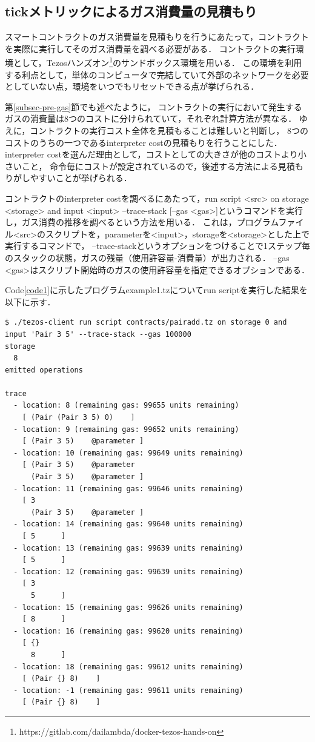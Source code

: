 \documentclass{kuisthesis}
\begin{document}
\subsection{tickメトリックによるガス消費量の見積もり} \label{subsec-pro-gas}
スマートコントラクトのガス消費量を見積もりを行うにあたって，コントラクトを実際に実行してそのガス消費量を調べる必要がある．
コントラクトの実行環境として，Tezosハンズオン\footnote{https://gitlab.com/dailambda/docker-tezos-hands-on}のサンドボックス環境を用いる．
この環境を利用する利点として，単体のコンピュータで完結していて外部のネットワークを必要としていない点，環境をいつでもリセットできる点が挙げられる．

第\ref{subsec-pre-gas}節でも述べたように，
コントラクトの実行において発生するガスの消費量は8つのコストに分けられていて，それぞれ計算方法が異なる．
ゆえに，コントラクトの実行コスト全体を見積もることは難しいと判断し，
8つのコストのうちの一つであるinterpreter costの見積もりを行うことにした．
interpreter costを選んだ理由として，コストとしての大きさが他のコストより小さいこと，
命令毎にコストが設定されているので，後述する方法による見積もりがしやすいことが挙げられる．

コントラクトのinterpreter costを調べるにあたって，run script <src> on storage <storage> and input <input> --trace-stack [--gas <gas>]というコマンドを実行し，ガス消費の推移を調べるという方法を用いる．
これは，プログラムファイル<src>のスクリプトを，parameterを<input>，storageを<storage>とした上で実行するコマンドで，
--trace-stackというオプションをつけることで1ステップ毎のスタックの状態，ガスの残量（使用許容量-消費量）が出力される．
--gas <gas>はスクリプト開始時のガスの使用許容量を指定できるオプションである．

Code\ref{code1}に示したプログラムexample1.tzについてrun scriptを実行した結果を以下に示す．

\begin{lstlisting}[basicstyle={\ttfamily\color{base}\scriptsize}]
$ ./tezos-client run script contracts/pairadd.tz on storage 0 and input 'Pair 3 5' --trace-stack --gas 100000
storage
  8
emitted operations
  
trace
  - location: 8 (remaining gas: 99655 units remaining)
    [ (Pair (Pair 3 5) 0)  	 ]
  - location: 9 (remaining gas: 99652 units remaining)
    [ (Pair 3 5)  	@parameter ]
  - location: 10 (remaining gas: 99649 units remaining)
    [ (Pair 3 5)  	@parameter
      (Pair 3 5)  	@parameter ]
  - location: 11 (remaining gas: 99646 units remaining)
    [ 3  	
      (Pair 3 5)  	@parameter ]
  - location: 14 (remaining gas: 99640 units remaining)
    [ 5  	 ]
  - location: 13 (remaining gas: 99639 units remaining)
    [ 5  	 ]
  - location: 12 (remaining gas: 99639 units remaining)
    [ 3  	
      5  	 ]
  - location: 15 (remaining gas: 99626 units remaining)
    [ 8  	 ]
  - location: 16 (remaining gas: 99620 units remaining)
    [ {}  	
      8  	 ]
  - location: 18 (remaining gas: 99612 units remaining)
    [ (Pair {} 8)  	 ]
  - location: -1 (remaining gas: 99611 units remaining)
    [ (Pair {} 8)  	 ]
\end{lstlisting}
\end{document}
